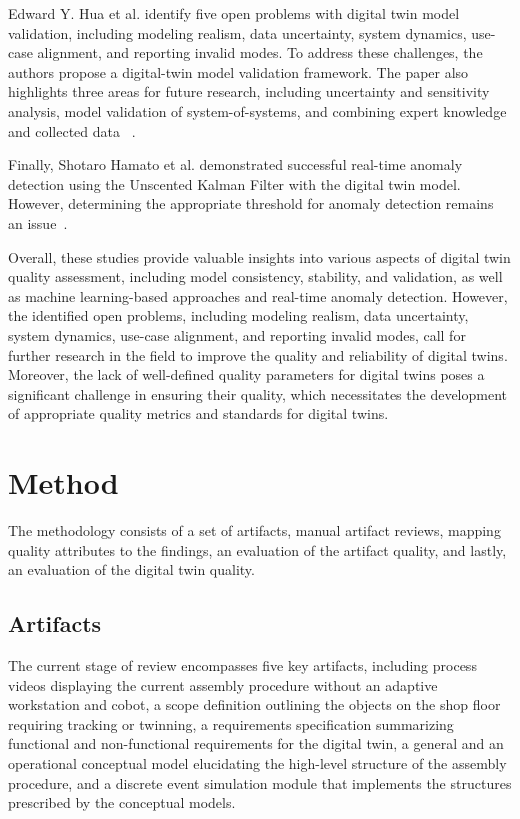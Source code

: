 \documentclass{llncs}
\begin{document}
    Edward Y. Hua et al. identify five open problems with digital twin model validation, including modeling realism, data uncertainty, system dynamics, use-case alignment, and reporting invalid modes. To address these challenges, the authors propose a digital-twin model validation framework. The paper also highlights three areas for future research, 
    including uncertainty and sensitivity analysis, model validation of system-of-systems, and combining expert knowledge and collected data ~\cite{ValidationofDigitalTwins}. 

    Finally, Shotaro Hamato et al. demonstrated successful real-time anomaly detection using the Unscented Kalman Filter with the digital twin model. 
    However, determining the appropriate threshold for anomaly detection remains an issue~\cite{JapeneseKalmanFilterCorrectness}.

    Overall, these studies provide valuable insights into various aspects of digital twin quality assessment, 
    including model consistency, stability, and validation, as well as machine learning-based approaches and real-time anomaly detection. 
    However, the identified open problems, including modeling realism, data uncertainty, system dynamics, use-case alignment, and reporting invalid modes, 
    call for further research in the field to improve the quality and reliability of digital twins. Moreover, 
    the lack of well-defined quality parameters for digital twins poses a significant challenge in ensuring their quality,
    which necessitates the development of appropriate quality metrics and standards for digital twins.
  
    \section{Method}
    The methodology consists of a set of artifacts, manual artifact reviews, mapping quality attributes to the findings, an evaluation of the artifact quality, and lastly, an evaluation of the digital twin quality.   
    \subsection{Artifacts}\label{section:Artifacts}
    The current stage of review encompasses five key artifacts, including process videos displaying the current assembly procedure without an adaptive workstation and cobot, a scope definition outlining the objects on the shop floor requiring tracking or twinning, a requirements specification summarizing functional and non-functional requirements for the digital twin, a general and an operational conceptual model elucidating the high-level structure of the assembly procedure, 
    and a discrete event simulation module that implements the structures prescribed by the conceptual models.
\end{document}
